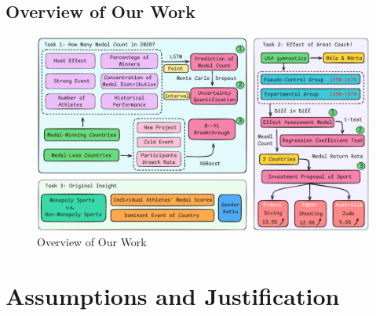\documentclass{mcmthesis}
\begin{document}
	\subsection{Overview of Our Work}
		\begin{figure}[H]
		\centering
		\includegraphics[width=1\linewidth]{fig/ourwork.png}
		\caption{Overview of Our Work}
		\label{fig:Overview of Our Work}
	\end{figure}
%	
%	
%	
%	
%	
%	
%	
%	
\section{Assumptions and Justification}
\end{document}
